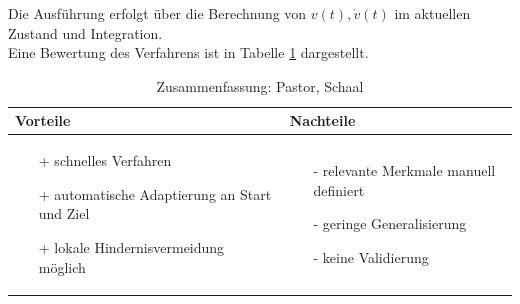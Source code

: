 Die Ausführung erfolgt über die Berechnung von $v(t), \dot{v}(t)$ im aktuellen Zustand und Integration.\\
Eine Bewertung des Verfahrens ist in Tabelle \ref{tab:pascha} dargestellt.
\begin{table}[hbt]
\centering
\begin{tabular}{|p{6.5cm}|p{6.5cm}|}
\hline
Vorteile & Nachteile\\
\hline
\vspace{-5mm}
\begin{itemize}
\setlength\itemsep{0em}
\item[+] schnelles Verfahren
\item[+] automatische Adaptierung an Start und Ziel
\item[+] lokale Hindernisvermeidung möglich
\end{itemize}
 &
 \vspace{-5mm}
\begin{itemize}
\setlength\itemsep{0em}
\item[-] relevante Merkmale manuell definiert
\item[-] geringe Generalisierung
\item[-] keine Validierung
\end{itemize}\\
\hline
\end{tabular}
\caption{Zusammenfassung: Pastor, Schaal}
\label{tab:pascha}
\end{table}\\ 
